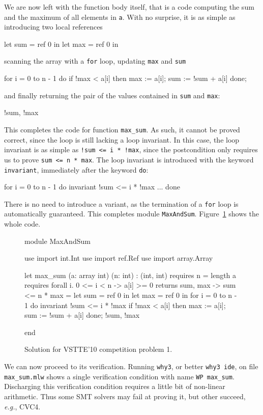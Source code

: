 We are now left with the function body itself, that is a code
computing the sum and the maximum of all elements in \texttt{a}. With
no surprise, it is as simple as introducing two local references
\begin{whycode}
    let sum = ref 0 in
    let max = ref 0 in
\end{whycode}
scanning the array with a \texttt{for} loop, updating \texttt{max}
and \texttt{sum}
\begin{whycode}
    for i = 0 to n - 1 do
      if !max < a[i] then max := a[i];
      sum := !sum + a[i]
    done;
\end{whycode}
and finally returning the pair of the values contained in \texttt{sum}
and \texttt{max}:
\begin{whycode}
  !sum, !max
\end{whycode}
This completes the code for function \texttt{max\_sum}.
As such, it cannot be proved correct, since the loop is still lacking
a loop invariant. In this case, the loop invariant is as simple as
\verb|!sum <= i * !max|, since the postcondition only requires us to prove
\verb|sum <= n * max|. The loop invariant is introduced with the
keyword \texttt{invariant}, immediately after the keyword \texttt{do}:
\begin{whycode}
    for i = 0 to n - 1 do
      invariant { !sum <= i * !max }
      ...
    done
\end{whycode}
There is no need to introduce a variant, as the termination of a
\texttt{for} loop is automatically guaranteed.
This completes module \texttt{MaxAndSum}.
Figure~\ref{fig:MaxAndSum} shows the whole code.
\begin{figure}
  \centering
\begin{whycode}
module MaxAndSum

  use import int.Int
  use import ref.Ref
  use import array.Array

  let max_sum (a: array int) (n: int) : (int, int)
    requires { n = length a }
    requires { forall i. 0 <= i < n -> a[i] >= 0 }
    returns  { sum, max -> sum <= n * max }
  = let sum = ref 0 in
    let max = ref 0 in
    for i = 0 to n - 1 do
      invariant { !sum <= i * !max }
      if !max < a[i] then max := a[i];
      sum := !sum + a[i]
    done;
    !sum, !max

end
\end{whycode}
\vspace*{-1em}%
  \caption{Solution for VSTTE'10 competition problem 1.}
  \label{fig:MaxAndSum}
\end{figure}
We can now proceed to its verification.
Running \texttt{why3}, or better \texttt{why3 ide}, on file
\verb|max_sum.mlw| shows a single verification condition with name
\verb|WP max_sum|.
Discharging this verification condition requires a little bit of non-linear
arithmetic. Thus some SMT solvers may fail at proving it, but other
succeed, \emph{e.g.}, CVC4.

